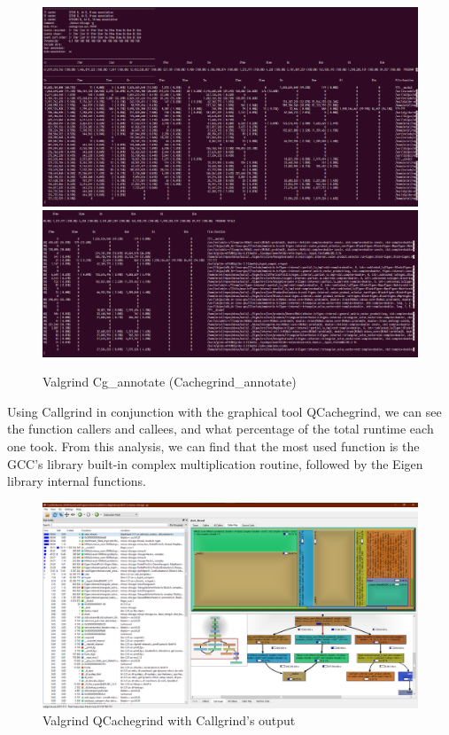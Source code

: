 \begin{figure}[H]
  \includegraphics[width=\columnwidth]{figs/valgrind_cg_annotate0}
  \includegraphics[width=\columnwidth]{figs/valgrind_cg_annotate1}
    \caption{Valgrind Cg\_annotate (Cachegrind\_annotate)}
\end{figure}
Using Callgrind in conjunction with the graphical tool QCachegrind, we can
see the function callers and callees, and what percentage of the total runtime
each one took. From this analysis, we can find that the most used function is
the GCC's library built-in complex multiplication routine, followed by the Eigen
library internal functions.
\begin{figure}[H]
    \includegraphics[width=\columnwidth]{figs/valgrind_qcachegrind_callgrind}
    \caption{Valgrind QCachegrind with Callgrind's output}
\end{figure}

